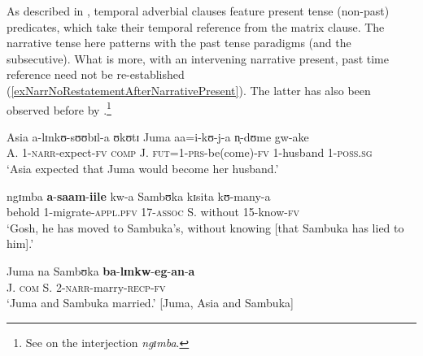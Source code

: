 As described in , temporal adverbial clauses feature present tense (non-past) predicates, which take their temporal reference from the matrix clause. The narrative tense here patterns with the past tense paradigms (and the subsecutive). What is more, with an intervening narrative present, past time reference need not be re-established (\ref{exNarrNoRestatementAfterNarrativePresent}). The latter has also been observed before by \citet{EatonH2013}.\footnote{See  on the interjection \textit{ngɪmba}.}

\begin{exe}
\ex \label{exNarrNoRestatementAfterNarrativePresent}
\begin{xlist}
\ex \gll Asia a-lɪnkʊ-sʊʊbɪl-a ʊkʊtɪ Juma aa=i-kʊ-j-a n̩-dʊme gw-ake\\
A. 1-\textsc{narr}-expect-\textsc{fv} \textsc{comp} J. \textsc{fut}=1-\textsc{prs}-be(come)-\textsc{fv} 1-husband 1-\textsc{poss.sg}\\
\glt \lq Asia expected that Juma would become her husband.'

\ex \gll ngɪmba \textbf{a}-\textbf{saam}-\textbf{iile} kw-a Sambʊka kɪsita kʊ-many-a\\
behold 1-migrate-\textsc{appl.pfv} 17-\textsc{assoc} S. without 15-know-\textsc{fv}\\
\glt \lq Gosh, he has moved to Sambuka's, without knowing [that Sambuka has lied to him].'\footnotemark

\ex \gll Juma na Sambʊka \textbf{ba}-\textbf{lɪnkw}-\textbf{eg}-\textbf{an}-\textbf{a}\\
J. \textsc{com} S. 2-\textsc{narr}-marry-\textsc{recp}-\textsc{fv}\\
\glt \lq Juma and Sambuka married.' [Juma, Asia and Sambuka]
\end{xlist}
\end{exe}


